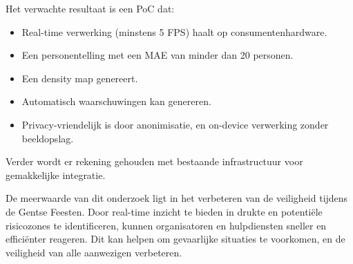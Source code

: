 Het verwachte resultaat is een PoC dat:
\begin{itemize}
  \item Real-time verwerking (minstens 5 FPS) haalt op consumentenhardware.
  \item Een personentelling met een MAE van minder dan 20 personen.
  \item Een density map genereert.
  \item Automatisch waarschuwingen kan genereren.
  \item Privacy-vriendelijk is door anonimisatie, en on-device verwerking zonder beeldopslag.
\end{itemize}

Verder wordt er rekening gehouden met bestaande infrastructuur voor gemakkelijke integratie.

De meerwaarde van dit onderzoek ligt in het verbeteren van de veiligheid tijdens de Gentse Feesten. Door real-time inzicht te bieden in drukte en potentiële risicozones te identificeren, kunnen organisatoren en hulpdiensten sneller en efficiënter reageren. Dit kan helpen om gevaarlijke situaties te voorkomen, en de veiligheid van alle aanwezigen verbeteren.
